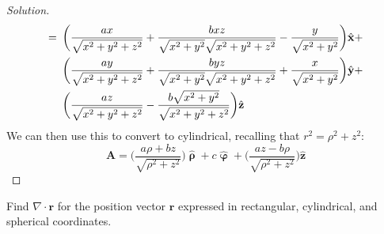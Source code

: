 \documentclass[crop=false,class=book,oneside]{standalone}
\begin{document}
\begin{proof}[Solution]
\begin{align*}
                    =\hspace{0.5em}
                    &\bigg(
                        \frac{ax}{\sqrt{x^{2}+y^{2}+z^{2}}}
                        +\frac{bxz}
                              {\sqrt{x^{2}+y^{2}}
                               \sqrt{x^{2}+y^{2}+z^{2}}}
                        -\frac{y}{\sqrt{x^{2}+y^{2}}}
                    \bigg)\hat{\mathbf{x}}+\\
                    &\bigg(
                        \frac{ay}{\sqrt{x^{2}+y^{2}+z^{2}}}
                        +\frac{byz}
                              {\sqrt{x^{2}+y^{2}}
                               \sqrt{x^{2}+y^{2}+z^{2}}}
                            +\frac{x}{\sqrt{x^{2}+y^{2}}}
                    \bigg)\hat{\mathbf{y}}+\\
                    &\bigg(
                        \frac{az}{\sqrt{x^{2}+y^{2}+z^{2}}}
                        -\frac{b\sqrt{x^{2}+y^{2}}}
                              {\sqrt{x^{2}+y^{2}+z^{2}}}
                    \bigg)
                    \hat{\mathbf{z}}
                \end{align*}
                We can then use this to convert to cylindrical,
                recalling that $r^{2}=\rho^{2}+z^{2}$:
                \begin{equation*}
                    \mathbf{A}
                    =\bigg(
                        \frac{a\rho+bz}{\sqrt{\rho^{2}+z^{2}}}
                    \bigg)
                    \hat{\boldsymbol{\uprho}}
                    +c\hat{\boldsymbol{\upvarphi}}
                    +\bigg(
                        \frac{az-b\rho}{\sqrt{\rho^{2}+z^{2}}}
                    \bigg)\hat{\mathbf{z}}
                \end{equation*}
            \end{proof}
            \begin{problem}[Wangsness 1-21]
                Find $\nabla\cdot\mathbf{r}$ for the position
                vector $\mathbf{r}$ expressed in rectangular,
                cylindrical, and spherical coordinates.
            \end{problem}
\end{document}

